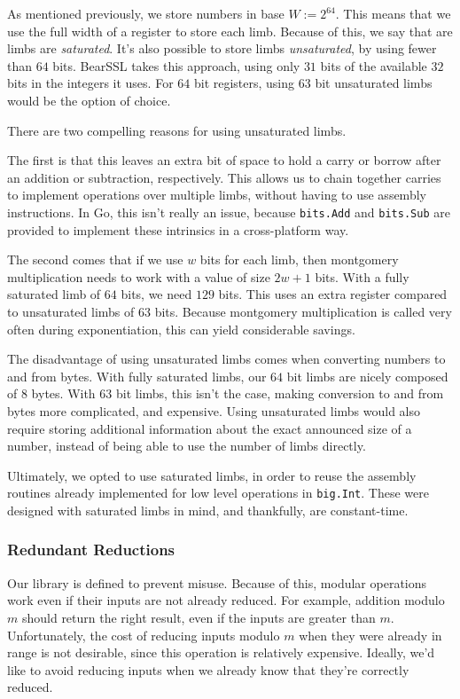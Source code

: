\documentclass[11pt, a4paper]{article} %
\begin{document}
{As mentioned previously, we store numbers in base
$W := 2^{64}$. This means that we use the full width of a register
to store each limb. Because of this, we say that are limbs
are \emph{saturated}. It's also possible to store
limbs \emph{unsaturated}, by using fewer than $64$ bits.
BearSSL 
\cite{pornin_bearssl_2020-1}
takes this approach, using only $31$ bits of the available $32$ bits
in the integers it uses. For $64$ bit registers, using $63$ bit unsaturated
limbs would be the option of choice.

There are two compelling reasons for using unsaturated limbs.

The first is that this leaves an extra bit of space to hold a carry
or borrow after an addition or subtraction, respectively. This allows
us to chain together carries to implement operations over multiple
limbs, without having to use assembly instructions. In Go,
this isn't really an issue, because \texttt{bits.Add} and
\texttt{bits.Sub} are provided to implement these intrinsics
in a cross-platform way.

The second comes that if we use $w$ bits for each limb, then montgomery
multiplication needs to work with a value of size $2w + 1$ bits. With a fully
saturated limb of $64$ bits, we need $129$ bits. This uses
an extra register compared to unsaturated limbs of $63$ bits. Because
montgomery multiplication is called very often during exponentiation,
this can yield considerable savings.

The disadvantage of using unsaturated limbs comes when converting
numbers to and from bytes. With fully saturated limbs, our
$64$ bit limbs are nicely composed of $8$ bytes. With $63$ bit limbs,
this isn't the case, making conversion to and from bytes more
complicated, and expensive. Using unsaturated limbs would
also require storing additional information about the exact
announced size of a number, instead of being able to use
the number of limbs directly.

Ultimately, we opted to use saturated limbs, in order to reuse
the assembly routines already implemented for low level
operations in \texttt{big.Int}. These were designed with
saturated limbs in mind, and thankfully, are constant-time.

\subsubsection{Redundant Reductions}

Our library is defined to prevent misuse. Because of this,
modular operations work even if their inputs are not already
reduced. For example, addition modulo $m$ should return the
right result, even if the inputs are greater than $m$.
Unfortunately, the cost of reducing inputs modulo $m$ when
they were already in range is not desirable, since this operation
is relatively expensive. Ideally, we'd like to avoid reducing
inputs when we already know that they're correctly reduced.

}
\end{document}
